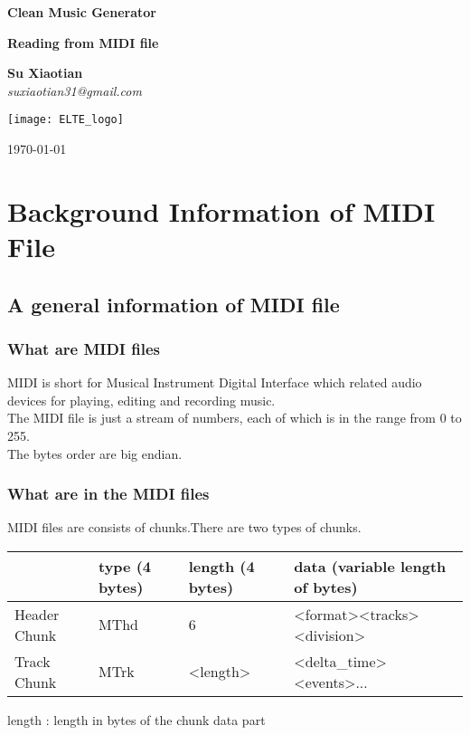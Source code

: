 \documentclass[12.5pt]{scrartcl}
\begin{document}
\begin{titlepage}
	\begin{center}
		\vspace*{2cm}
		
		\Huge
		\textbf{Clean Music Generator}
		
		\vspace{0.8cm}
		\LARGE
		\textbf{Reading from MIDI file}
		
		\vspace{1.8cm}
		
		\textbf{Su Xiaotian}\\
		\textit{suxiaotian31@gmail.com}	
		\vfill
		
		\texttt{[image: ELTE\_logo]}
		
		\Huge
		\today	
	\end{center}
\end{titlepage}

\tableofcontents
\newpage

\setlength{\parskip}{5pt}
\section{Background Information of MIDI File}
\subsection{A general information of MIDI file}
\subsubsection{What are MIDI files}
MIDI is short for Musical Instrument Digital Interface which related audio devices for playing, editing and recording music.\\
The MIDI file is just a stream of numbers, each of which is in the range from 0 to 255.\\
The bytes order are big endian.\\
\subsubsection{What are in the MIDI files}
MIDI files are consists of chunks.There are two types of chunks.\\
\renewcommand{\arraystretch}{2.0}
\begin{center}
	\begin{tabu}{|l|m{5em}|m{5em}|m{13em}|}
	   \hline
	        & type \newline (4 bytes)
	        & length \newline (4 bytes) 
	        & data \newline (variable length of bytes) \\
		\hline
		Header Chunk & MThd & 6 & <format><tracks><division>\\ 
		\hline
		Track Chunk & MTrk & <length> & <delta\_time><events>... \\  
		\hline
	\end{tabu}
\end{center}
length : length in bytes of the chunk data part
\end{document}
